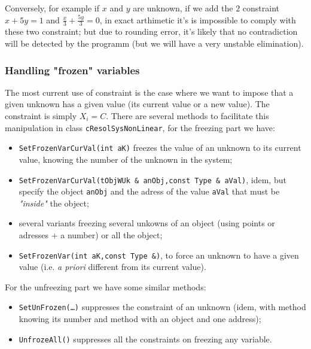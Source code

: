 Conversely, for example if $x$ and $y$ are unknown, if we add the $2$ constraint $x+5y=1$ and $\frac{x}{3}+ \frac{5y}{3}=0$,
in exact arthimetic it's is impossible to comply with these two constraint; but due to rounding error, it's likely
that no contradiction will be detected by the programm (but we will have a very unstable elimination).


\subsubsection{Handling "frozen" variables}

The most current use of constraint is the case where we want to impose that a given unknown
has a given value (its current value or a new value). The constraint is simply
$X_i=C$.   There are several methods to facilitate this manipulation in class {\tt cResolSysNonLinear}, for
the freezing part we have:

\begin{itemize}
     \item   {\tt SetFrozenVarCurVal(int aK)} freezes the value of an unknown to its current value,
              knowing the number of the unknown in the system;
     \item   {\tt SetFrozenVarCurVal(tObjWUk \& anObj,const  Type \& aVal)}, idem, but specify the object {\tt anObj}
	     and the adress of the value {\tt aVal} that must be \emph{"inside"} the object;
     \item  several variants freezing several unkowns of an object (using points or adresses + a number) or all the
            object;
      \item  {\tt SetFrozenVar(int aK,const  Type \&)}, to force an unknown to have a given value
             (i.e. \emph{a priori} different from its current value).

\end{itemize}

For the unfreezing part we have some similar methods:

\begin{itemize}
	\item   {\tt SetUnFrozen(\dots)} suppresses the constraint of an unknown (idem, with method knowing its number
		and method with an object and one address);
      \item  {\tt UnfrozeAll()} suppresses all the constraints on freezing any variable.
\end{itemize}

